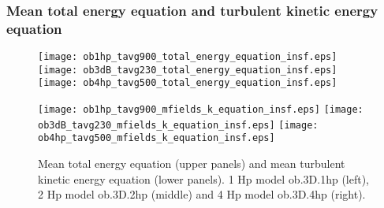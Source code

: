 \documentclass[10pt,paper=a4]{report}
\begin{document}





\newpage

\subsubsection{Mean total energy equation and turbulent kinetic energy equation}

\begin{figure}[!h]
\centerline{
\texttt{[image: ob1hp\_tavg900\_total\_energy\_equation\_insf.eps]}
\texttt{[image: ob3dB\_tavg230\_total\_energy\_equation\_insf.eps]}
\texttt{[image: ob4hp\_tavg500\_total\_energy\_equation\_insf.eps]}}

\centerline{
\texttt{[image: ob1hp\_tavg900\_mfields\_k\_equation\_insf.eps]}
\texttt{[image: ob3dB\_tavg230\_mfields\_k\_equation\_insf.eps]}
\texttt{[image: ob4hp\_tavg500\_mfields\_k\_equation\_insf.eps]}}
\caption{Mean total energy equation (upper panels) and mean turbulent kinetic energy equation (lower panels). 1 Hp model {\sf ob.3D.1hp} (left), 2 Hp model {\sf ob.3D.2hp} (middle) and 4 Hp model {\sf ob.3D.4hp} (right).}
\end{figure}

\newpage
\end{document}
